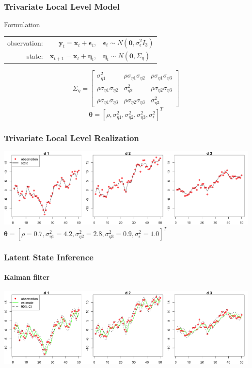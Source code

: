 \documentclass[11pt]{beamer}
\begin{document}
\begin{frame}
\frametitle{Trivariate Local Level Model}
\begin{block}{Formulation}
\begin{center}
\begin{tabular}{ r r l }
  observation: & $\boldsymbol{y}_t = \boldsymbol{x}_t + \boldsymbol{\epsilon}_t$, & $\boldsymbol{\epsilon}_t \sim N(\textbf{0}, \sigma_{\epsilon}^2 I_3)$ \\
  state: & $\boldsymbol{x}_{t+1} = \boldsymbol{x}_t + \boldsymbol{\eta}_t$, & $\boldsymbol{\eta}_t \sim N(\textbf{0}, \Sigma_{\eta})$ \\
\end{tabular}
\end{center}
\end{block}
$$
\Sigma_{\eta} = 
\begin{bmatrix}
\sigma_{\eta 1}^2 & \rho \sigma_{\eta 1} \sigma_{\eta 2} & \rho \sigma_{\eta 1} \sigma_{\eta 3}
\\ \rho \sigma_{\eta 1} \sigma_{\eta 2} & \sigma_{\eta 2}^2 & \rho \sigma_{\eta 2} \sigma_{\eta 3}
\\ \rho \sigma_{\eta 1} \sigma_{\eta 3} & \rho \sigma_{\eta 2} \sigma_{\eta 3} & \sigma_{\eta 3}^2
\end{bmatrix}
$$
\bigskip
$$
\boldsymbol{\theta} = [\rho, \sigma_{\eta 1}^2, \sigma_{\eta 2}^2, \sigma_{\eta 3}^2, \sigma_{\epsilon}^2]^T
$$
\end{frame}

\begin{frame}
\frametitle{Trivariate Local Level Realization}
\centering
\includegraphics[scale=0.35]{mllm-realization-v2}\\
\bigskip
$\boldsymbol{\theta} = [\rho = 0.7, \sigma_{\eta 1}^2 = 4.2, \sigma_{\eta 2}^2 = 2.8, \sigma_{\eta 3}^2 = 0.9, \sigma_{\epsilon}^2 = 1.0]^T$
\end{frame}

\begin{frame}
\frametitle{Latent State Inference}
\framesubtitle{Kalman filter}
\centering
\includegraphics[scale=0.35]{mllm-estimate-kalman}
\end{frame}
\end{document}
